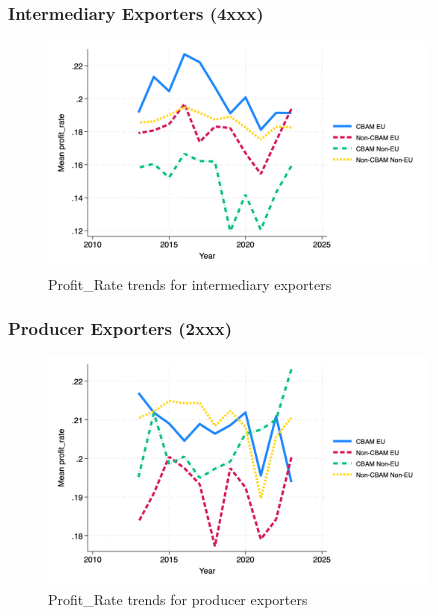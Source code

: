 \documentclass{article}
\begin{document}
\subsubsection{Intermediary Exporters (4xxx)}
\begin{figure}[h!]
\centering
\includegraphics[width=0.9\textwidth]{profit_rate_ei.png}
\caption{Profit_Rate trends for intermediary exporters}
\label{fig:profit_rate_ei}
\end{figure}

\subsubsection{Producer Exporters (2xxx)}
\begin{figure}[h!]
\centering
\includegraphics[width=0.9\textwidth]{profit_rate_ep.png}
\caption{Profit_Rate trends for producer exporters}
\label{fig:profit_rate_ep}
\end{figure}
\end{document}
